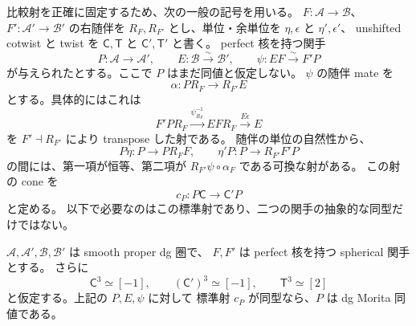 比較射を正確に固定するため、次の一般の記号を用いる。
$F:\mathcal A\to\mathcal B$、$F':\mathcal A'\to\mathcal B'$ の右随伴を
$R_F,R_{F'}$ とし、単位・余単位を $\eta,\epsilon$ と $\eta',\epsilon'$、
unshifted cotwist と twist を $\mathsf C,\mathsf T$ と
$\mathsf C',\mathsf T'$ と書く。
perfect 核を持つ関手
\[
 P:\mathcal A\longrightarrow\mathcal A',\qquad
 E:\mathcal B\xrightarrow{\sim}\mathcal B',\qquad
 \psi:EF\xrightarrow{\sim}F'P
\]
が与えられたとする。ここで $P$ はまだ同値と仮定しない。
$\psi$ の随伴 mate を
\begin{equation}
\label{cmo:eq:spherical-canonical-mate}
 \alpha:P R_F\longrightarrow R_{F'}E
\end{equation}
とする。具体的にはこれは
\[
 F'P R_F\xrightarrow{\psi_{R_F}^{-1}}EF R_F
                   \xrightarrow{E\epsilon}E
\]
を $F'\dashv R_{F'}$ により transpose した射である。
随伴の単位の自然性から、
\[
 P\eta:P\longrightarrow P R_F F,\qquad
 \eta'P:P\longrightarrow R_{F'}F'P
\]
の間には、第一項が恒等、第二項が
$R_{F'}\psi\circ\alpha_F$ である可換な射がある。
この射の cone を
\begin{equation}
\label{cmo:eq:spherical-canonical-cotwist-map}
 c_P:P\mathsf C\longrightarrow\mathsf C'P
\end{equation}
と定める。
以下で必要なのはこの標準射であり、二つの関手の抽象的な同型だけではない。

\begin{theorem}
\label{cmo:thm:spherical-cotwist-comparison}
$\mathcal A,\mathcal A',\mathcal B,\mathcal B'$ は smooth proper dg 圏で、
$F,F'$ は perfect 核を持つ spherical 関手とする。
さらに
\begin{equation}
\label{cmo:eq:spherical-comparison-period-input}
 \mathsf C^3\simeq[-1],\qquad
 (\mathsf C')^3\simeq[-1],\qquad
 \mathsf T^3\simeq[2]
\end{equation}
と仮定する。上記の $P,E,\psi$ に対して
標準射 $c_P$ が同型なら、$P$ は dg Morita 同値である。
\end{theorem}


